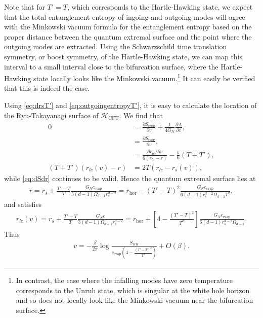 \documentclass[11pt,a4paper]{article}
\begin{document}
Note that for $T' = T$, which corresponds to the Hartle-Hawking state, we expect that the total entanglement entropy of ingoing and outgoing modes will agree with the Minkowski vacuum formula for the entanglement entropy based on the proper distance between the quantum extremal surface and the point where the outgoing modes are extracted. Using the Schwarzschild time translation symmetry, or boost symmetry, of the Hartle-Hawking state, we can map this interval to a small interval close to the bifurcation surface, where the Hartle-Hawking state locally looks like the Minkowski vacuum.\footnote{In contrast, the case where the infalling modes have zero temperature corresponds to the Unruh state, which is singular at the white hole horizon and so does not locally look like the Minkowski vacuum near the bifurcation surface.} It can easily be verified that this is indeed the case.

Using \eqref{eq:drsT'} and \eqref{eq:outgoingentropyT'}, it is easy to calculate the location of the Ryu-Takayanagi surface of $\mathcal{H}_\text{CFT}$. We find that
\begin{align}
0 &= \frac{\partial S_\text{bulk}}{\partial v} + \frac{1}{4G_N} \frac{\partial A}{\partial v},
\\& = \frac{\partial S_\text{bulk}}{\partial v},
\\& = \frac{\partial r_{lc}/\partial v}{6(r_{lc} - r)} - \frac{\pi}{6} (T+T'),
\\(T+T') (r_{lc}(v) - r)& = 2 T (r_{lc} - r_s(v)),
\end{align}
while \eqref{eq:dSdr} continues to be valid. Hence the quantum extremal surface lies at
\begin{align} \label{eq:rqT'}
r = r_s + \frac{T' - T}{T} \frac{G_N c_\text{evap}}{3(d-1) \Omega_{d-1} r_s^{d-2}} = r_\text{hor} - (T'-T)^2 \frac{ G_N c_\text{evap}}{6 (d-1) r_s^{d-2} \Omega_{d-1} T^2}, 
\end{align}
and satisfies
\begin{align} \label{eq:rlcT'}
r_{lc}(v) = r_s + \frac{T' + T}{T} \frac{G_N c}{3(d-1) \Omega_{d-1} r_s^{d-2}} = r_\text{hor} +\left[4- \frac{(T'-T)^2}{T^2}\right] \frac{ G_N c_\text{evap}}{6 (d-1) r_s^{d-2} \Omega_{d-1}}.
\end{align}
Thus
\begin{align} \label{eq:vT'}
v = - \frac{\beta}{2 \pi} \log\frac{S_{BH}}{c_\text{evap} (4- \frac{(T'-T)^2}{T^2})} + O(\beta).
\end{align}
\end{document}
